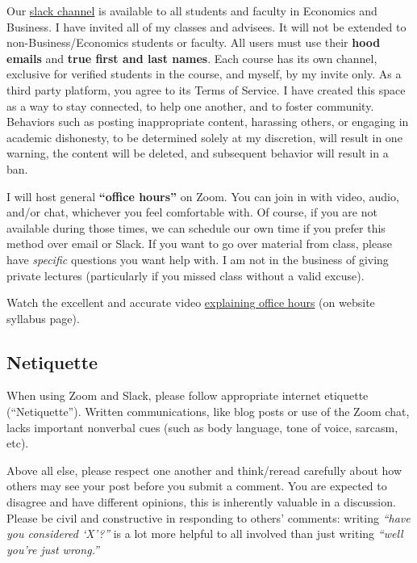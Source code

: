 \documentclass{article}
\begin{document}
Our \href{https://hoodcollegeeconomics.slack.com}{slack channel} is
available to all students and faculty in Economics and Business. I have
invited all of my classes and advisees. It will not be extended to
non-Business/Economics students or faculty. All users must use their
\textbf{hood emails} and \textbf{true first and last names}. Each course
has its own channel, exclusive for verified students in the course, and
myself, by my invite only. As a third party platform, you agree to its
Terms of Service. I have created this space as a way to stay connected,
to help one another, and to foster community. Behaviors such as posting
inappropriate content, harassing others, or engaging in academic
dishonesty, to be determined solely at my discretion, will result in one
warning, the content will be deleted, and subsequent behavior will
result in a ban.

I will host general \textbf{``office hours''} on Zoom. You can join in
with video, audio, and/or chat, whichever you feel comfortable with. Of
course, if you are not available during those times, we can schedule our
own time if you prefer this method over email or Slack. If you want to
go over material from class, please have \emph{specific} questions you
want help with. I am not in the business of giving private lectures
(particularly if you missed class without a valid excuse).

Watch the excellent and accurate video
\href{https://vimeo.com/270014784}{explaining office hours} (on website
syllabus page).

\hypertarget{netiquette}{%
\subsection*{Netiquette}\label{netiquette}}

When using Zoom and Slack, please follow appropriate internet etiquette
(``Netiquette''). Written communications, like blog posts or use of the
Zoom chat, lacks important nonverbal cues (such as body language, tone
of voice, sarcasm, etc).

Above all else, please respect one another and think/reread carefully
about how others may see your post before you submit a comment. You are
expected to disagree and have different opinions, this is inherently
valuable in a discussion. Please be civil and constructive in responding
to others' comments: writing \emph{``have you considered `X'?''} is a
lot more helpful to all involved than just writing \emph{``well you're
just wrong.''}
\end{document}
